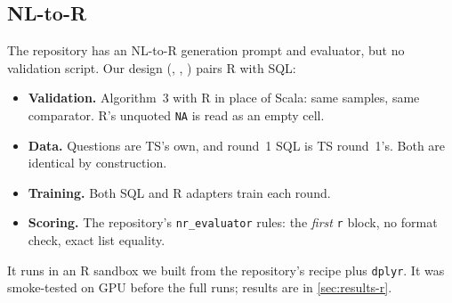\subsection{NL-to-R}\label{sec:method-r}

The repository has an NL-to-R generation prompt and evaluator, but no validation script. Our design
(, , ) pairs R with SQL:
\begin{itemize}
\item \textbf{Validation.} Algorithm~3 with R in place of Scala: same samples, same comparator. R's unquoted
\texttt{NA} is read as an empty cell.
\item \textbf{Data.} Questions are TS's own, and round~1 SQL is TS round~1's. Both are identical by construction.
\item \textbf{Training.} Both SQL and R adapters train each round.
\item \textbf{Scoring.} The repository's \texttt{nr\_evaluator} rules: the \emph{first} \texttt{r} block, no format
check, exact list equality.
\end{itemize}
It runs in an R sandbox we built from the repository's recipe plus \texttt{dplyr}. It was smoke-tested on GPU before
the full runs; results are in \cref{sec:results-r}.
